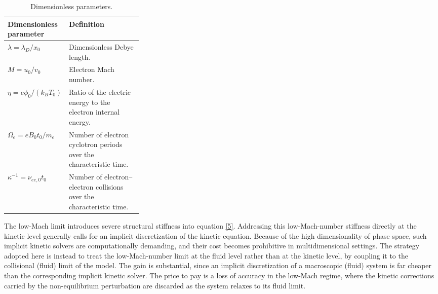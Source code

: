 \documentclass[pdflatex,final,10pt]{article}
\newcommand{\Fabrice}[1]{#1}
\begin{document}
\begin{table}[!ht]
    \centering
    \caption{Dimensionless parameters.}
    \label{4}
    \begin{tabularx}{\linewidth}{
        @{}
        >{\raggedright\arraybackslash}p{0.31\linewidth}
        >{\raggedright\arraybackslash}X
        @{}
    }
        \toprule
        Dimensionless parameter & Definition \\
        \midrule
        $\lambda=\lambda_D/x_0$
        & Dimensionless Debye length. \\

        $M=u_0/v_0$
        & Electron Mach number. \\

        $\eta=e\phi_0/(k_BT_0)$
        & Ratio of the electric energy to the electron internal energy. \\

        $\Omega_e=eB_0t_0/m_e$
        & Number of electron cyclotron periods over the characteristic time. \\

        $\kappa^{-1}=\nu_{ee,0}t_0$
        & Number of electron--electron collisions over the characteristic time. \\
        \bottomrule
    \end{tabularx}
\end{table}

\Fabrice{The low-Mach limit introduces severe structural stiffness into equation \eqref{5}.
Addressing this low-Mach-number stiffness directly at the kinetic level generally calls for an implicit discretization of the kinetic equation. Because of the high dimensionality of phase space, such implicit kinetic solvers are computationally demanding, and their cost becomes prohibitive in multidimensional settings. The strategy adopted here is instead to treat the low-Mach-number limit at the fluid level rather than at the kinetic level, by coupling it to the collisional (fluid) limit of the model. The gain is substantial, since an implicit discretization of a macroscopic (fluid) system is far cheaper than the corresponding implicit kinetic solver. The price to pay is a loss of accuracy in the low-Mach regime, where the kinetic corrections carried by the non-equilibrium perturbation are discarded as the system relaxes to its fluid limit.}
\end{document}

